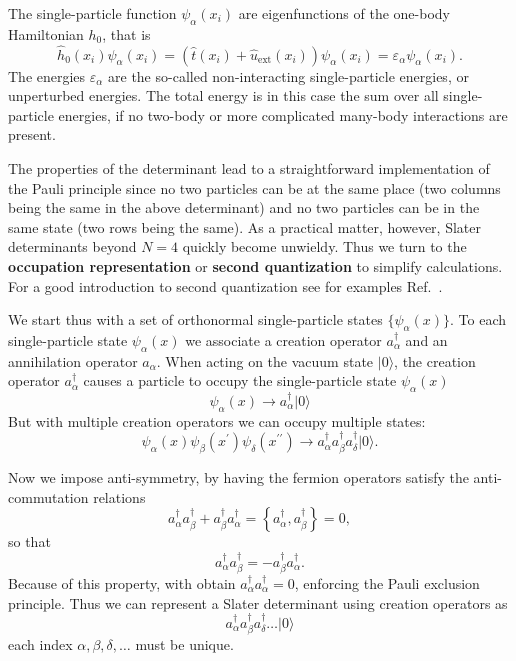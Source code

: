 The single-particle function $\psi_{\alpha}(x_i)$  are eigenfunctions of the one-body
Hamiltonian $h_0$, that is
\[
\hat{h}_0(x_i) \psi_{\alpha}(x_i)=\left(\hat{t}(x_i) + \hat{u}_{\mathrm{ext}}(x_i)\right)\psi_{\alpha}(x_i)=\varepsilon_{\alpha}\psi_{\alpha}(x_i).
\]
The energies $\varepsilon_{\alpha}$ are the so-called non-interacting single-particle energies, or unperturbed energies. 
The total energy is in this case the sum over all  single-particle energies, if no two-body or more complicated
many-body interactions are present.

The properties of the determinant lead to a straightforward implementation of the Pauli principle since 
no two particles can be at the same place (two columns being the same in the above determinant) and
no two particles can be in the same state (two rows being the same).
As a practical matter, however, Slater determinants beyond $N=4$
quickly become unwieldy. Thus we turn to the \textbf{occupation representation} or \textbf{second quantization} to simplify
calculations. For a good introduction to second quantization see for examples Ref.~\cite{shavittbartlett2009}.

We start thus with a set of orthonormal single-particle states
$\{ \psi_{\alpha}(x) \}$.  To each single-particle state $\psi_{\alpha}(x)$ we associate a creation operator 
$a^\dagger_{\alpha}$ and an annihilation operator $a_{\alpha}$. 
When acting on the vacuum state $| 0 \rangle$, the creation operator $a^\dagger_{\alpha}$ causes 
a particle to occupy the single-particle state $\psi_{\alpha}(x)$
\[
\psi_{\alpha}(x) \rightarrow a^\dagger_{\alpha} |0 \rangle
\]
But with multiple creation operators we can occupy multiple states:
\[
\psi_{\alpha}(x) \psi_{\beta}(x^\prime) \psi_{\delta}(x^{\prime \prime}) 
\rightarrow a^\dagger_{\alpha} a^\dagger_{\beta} a^\dagger_{\delta} |0 \rangle.
\]

Now we impose anti-symmetry, by having the fermion operators satisfy  the anti-commutation relations
\[
a^\dagger_{\alpha} a^\dagger_{\beta} + a^\dagger_{\beta} a^\dagger_{\alpha}
= \left\{ a^\dagger_{\alpha} ,a^\dagger_{\beta}\right\}= 0,
\]
so that 
\[
a^\dagger_{\alpha} a^\dagger_{\beta} = - a^\dagger_{\beta} a^\dagger_{\alpha}.
\]
Because of this property, with obtain $a^\dagger_{\alpha} a^\dagger_{\alpha} = 0$, 
enforcing the Pauli exclusion principle.  Thus we can represent a Slater determinant 
using creation operators as
\[
a^\dagger_{\alpha} a^\dagger_{\beta} a^\dagger_{\delta} \ldots |0 \rangle
\]
each index $\alpha,\beta,\delta, \ldots$ must be unique.

